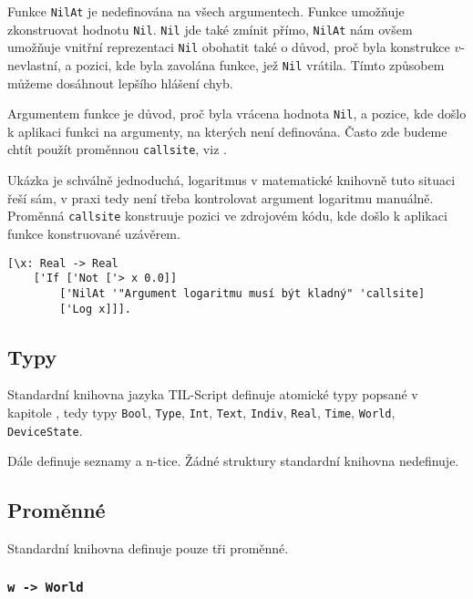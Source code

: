 Funkce \lstinline{NilAt} je nedefinována na všech argumentech. Funkce umožňuje zkonstruovat hodnotu
\lstinline{Nil}. \lstinline{Nil} jde také zmínit přímo, \lstinline{NilAt} nám ovšem umožňuje vnitřní
reprezentaci \lstinline{Nil} obohatit také o důvod, proč byla konstrukce $v$-nevlastní, a pozici,
kde byla zavolána funkce, jež \lstinline{Nil} vrátila. Tímto způsobem můžeme dosáhnout lepšího
hlášení chyb.

Argumentem funkce je důvod, proč byla vrácena hodnota \lstinline{Nil}, a pozice, kde došlo
k aplikaci funkci na argumenty, na kterých není definována. Často zde budeme chtít použít proměnnou
\lstinline{callsite}, viz .

Ukázka je schválně jednoduchá, logaritmus v matematické knihovně tuto situaci řeší sám, v praxi tedy
není třeba kontrolovat argument logaritmu manuálně. Proměnná \lstinline{callsite} konstruuje
pozici ve zdrojovém kódu, kde došlo k aplikaci funkce konstruované uzávěrem.

\begin{lstlisting}[caption={Ukázka využití NilAt}]
[\x: Real -> Real
    ['If ['Not ['> x 0.0]]
        ['NilAt '"Argument logaritmu musí být kladný" 'callsite]
        ['Log x]]].
\end{lstlisting}


\subsection{Typy}

Standardní knihovna jazyka TIL-Script definuje atomické typy popsané v kapitole
, tedy typy
\lstinline{Bool}, \lstinline{Type}, \lstinline{Int}, \lstinline{Text}, \lstinline{Indiv},
\lstinline{Real}, \lstinline{Time}, \lstinline{World}, \lstinline{DeviceState}.

Dále definuje seznamy a n-tice. Žádné struktury standardní knihovna nedefinuje.

\subsection{Proměnné}

Standardní knihovna definuje pouze tři proměnné.

\subsubsection{\lstinline{w -> World}}

